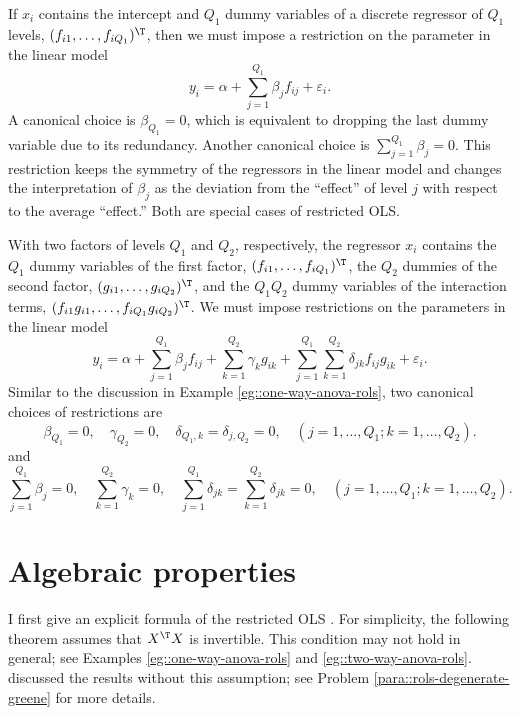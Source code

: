 \begin{example}\label{eg::one-way-anova-rols}
If $x_i  $ contains the intercept and $Q_1$ dummy variables of a discrete regressor of $Q_1$ levels, $(f_{i1}, \ldots, f_{iQ_1})^{\T}$, then we must impose a restriction on the parameter  in the linear model
$$
y_i = \alpha +\sum_{j=1}^{Q_1}   \beta_j f_{ij}   + \varepsilon_i.
$$
A canonical choice is $\beta_{Q_1} = 0$, which is equivalent to dropping the last dummy variable due to its redundancy. Another canonical choice is $\sum_{j=1}^{Q_1}   \beta_j  = 0$. This restriction keeps the symmetry of the regressors in the linear model and changes the interpretation of $\beta_j$ as the deviation from the ``effect'' of level $j$ with respect to the average ``effect.'' Both are special cases of restricted OLS.   
\end{example}



\begin{example}\label{eg::two-way-anova-rols}
With two factors of levels $Q_1$ and $Q_2$, respectively, the regressor $x_i$ contains the $Q_1$ dummy variables of the first factor, $(f_{i1}, \ldots, f_{iQ_1})^{\T}$, the $Q_2$ dummies of the second factor, $(g_{i1}, \ldots, g_{iQ_2})^{\T}$, and  the $Q_1Q_2$ dummy variables of the interaction terms, $(f_{i1}g_{i1}, \ldots, f_{iQ_1} g_{iQ_2})^{\T}$. We must impose restrictions on the parameters in the linear model
$$
y_i = \alpha + \sum_{j=1}^{Q_1}   \beta_j f_{ij} + \sum_{k=1}^{Q_2}  \gamma_k g_{ik} 
+ \sum_{j=1}^{Q_1}    \sum_{k=1}^{Q_2}  \delta_{jk} f_{ij} g_{ik}   + \varepsilon_i .
$$
Similar to the discussion in Example \ref{eg::one-way-anova-rols}, two canonical choices of restrictions are 
$$
\beta_{Q_1} = 0, \quad 
\gamma_{Q_2} = 0,\quad 
\delta_{Q_1, k} = \delta_{j, Q_2} = 0 ,\quad (j=1,\ldots, Q_1; k = 1, \ldots, Q_2) .
$$
and
$$
 \sum_{j=1}^{Q_1}   \beta_j = 0,\quad
 \sum_{k=1}^{Q_2}  \gamma_k = 0,\quad
  \sum_{j=1}^{Q_1}    \delta_{jk}  =  \sum_{k=1}^{Q_2}  \delta_{jk} =0,\quad (j=1,\ldots, Q_1; k = 1, \ldots, Q_2) .
$$
\end{example}


\section{Algebraic properties}




I first give an explicit formula of the restricted OLS \citep{theil, rao}. For simplicity, the following theorem assumes that $ X^{\T} X$ is invertible. This condition may not hold in general; see Examples \ref{eg::one-way-anova-rols} and \ref{eg::two-way-anova-rols}. \citet{greene} discussed the results without this assumption; see Problem \ref{para::rols-degenerate-greene} for more details.  

